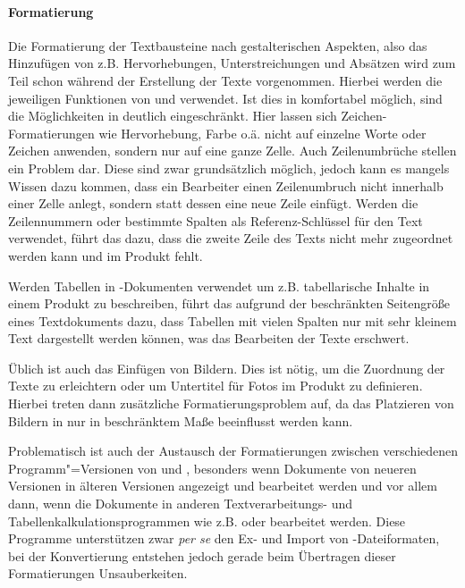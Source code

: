 \paragraph{Formatierung} Die Formatierung der Textbausteine nach gestalterischen Aspekten, also das Hinzufügen von z.B. Hervorhebungen, Unterstreichungen und Absätzen wird zum Teil schon während der Erstellung der Texte vorgenommen. Hierbei werden die jeweiligen Funktionen von  und  verwendet. Ist dies in  komfortabel möglich, sind die Möglichkeiten in  deutlich eingeschränkt. Hier lassen sich Zeichen-Formatierungen wie Hervorhebung, Farbe o.ä. nicht auf einzelne Worte oder Zeichen anwenden, sondern nur auf eine ganze Zelle. Auch Zeilenumbrüche stellen ein Problem dar. Diese sind zwar grundsätzlich möglich, jedoch kann es mangels Wissen dazu kommen, dass ein Bearbeiter einen Zeilenumbruch nicht innerhalb einer Zelle anlegt, sondern statt dessen eine neue Zeile einfügt. Werden die Zeilennummern oder bestimmte Spalten als Referenz-Schlüssel für den Text verwendet, führt das dazu, dass die zweite Zeile des Texts nicht mehr zugeordnet werden kann und im Produkt fehlt. 

Werden Tabellen in -Dokumenten verwendet um z.B. tabellarische Inhalte in einem Produkt zu beschreiben, führt das aufgrund der beschränkten Seitengröße eines Textdokuments dazu, dass Tabellen mit vielen Spalten nur mit sehr kleinem Text dargestellt werden können, was das Bearbeiten der Texte erschwert. 

Üblich ist auch das Einfügen von Bildern. Dies ist nötig, um die Zuordnung der Texte zu erleichtern oder um Untertitel für Fotos im Produkt zu definieren. Hierbei treten dann zusätzliche Formatierungsproblem auf, da das Platzieren von Bildern in  nur in beschränktem Maße beeinflusst werden kann. 

Problematisch ist auch der Austausch der Formatierungen zwischen verschiedenen Programm"=Versionen von  und , besonders wenn Dokumente von neueren Versionen in älteren Versionen angezeigt und bearbeitet werden und vor allem dann, wenn die Dokumente in anderen Textverarbeitungs- und Tabellenkalkulationsprogrammen wie z.B.   oder  bearbeitet werden. Diese Programme unterstützen zwar \emph{per se} den Ex- und Import von -Dateiformaten, bei der Konvertierung entstehen jedoch gerade beim Übertragen dieser Formatierungen Unsauberkeiten. 

